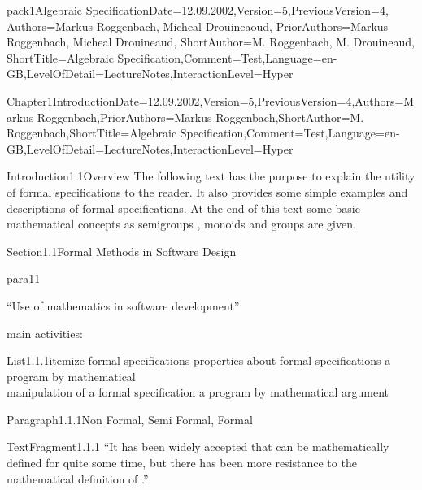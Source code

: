 \documentclass[landscape, slides, light]{mmiss2}
\begin{document}
\begin{Package}{pack1}{Algebraic
Specification}{Date=12.09.2002,Version=5,PreviousVersion=4,
Authors={Markus Roggenbach, Micheal Drouineaoud},
PriorAuthors={Markus Roggenbach, Micheal Drouineaud},
ShortAuthor={M. Roggenbach, M. Drouineaud},
ShortTitle={Algebraic Specification},Comment=Test,Language=en-GB,LevelOfDetail=LectureNotes,InteractionLevel=Hyper}

\begin{Section}{Chapter1}{Introduction}{Date=12.09.2002,Version=5,PreviousVersion=4,Authors={Markus
Roggenbach},PriorAuthors={Markus
Roggenbach},ShortAuthor={M. Roggenbach},ShortTitle={Algebraic Specification},Comment=Test,Language=en-GB,LevelOfDetail=LectureNotes,InteractionLevel=Hyper}
\begin{Introduction}{Introduction1.1}{Overview}{}
The following text has the purpose to explain the utility of formal
specifications to the reader. It also provides some simple examples
and descriptions of formal specifications. At the end of this text some
basic mathematical concepts as semigroups
, monoids
 and groups
 are given.
\end{Introduction}
\begin{Section}{Section1.1}{Formal Methods in Software Design}{}
\begin{Paragraph}{para11}{}{}
\begin{center}
``Use of mathematics in software development''\\
\end{center}
main activities:
\begin{List}{List1.1.1}{itemize}{}
\ListItem{}
{ formal specifications  \pause}
\ListItem{}
{ properties about formal specifications \pause}
\ListItem{}
{ a program by mathematical \\
            manipulation of a formal specification \pause}
\ListItem{}
{ a program by mathematical argument}
\end{List}
\end{Paragraph}

\begin{Paragraph}{Paragraph1.1.1}{Non Formal, Semi Formal, Formal}{}

\begin{TextFragment}{TextFragment1.1.1}{}
``It has been widely accepted that  can be mathematically
defined for quite some time, but there has been more resistance to the
mathematical definition of .''
\end{TextFragment}


\end{Paragraph}
\end{Section}
\end{Section}
\end{Package}
\end{document}
